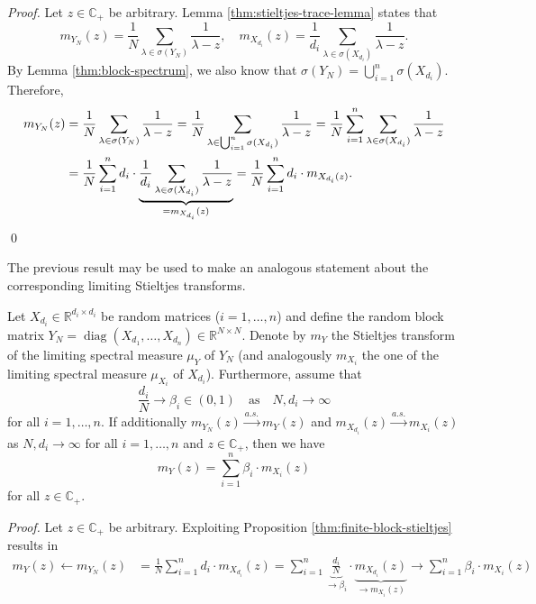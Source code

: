 \documentclass{article}
\begin{document}
\smallskip
\noindent
\emph{Proof.} Let $z\in\mathbb{C}_+$ be arbitrary. Lemma \ref{thm:stieltjes-trace-lemma} states that
\begin{equation}
m_{Y_N}(z)=\frac{1}{N}\sum_{\lambda\in\sigma(Y_N)}\frac{1}{\lambda-z},\quad m_{X_{d_i}}(z)=\frac{1}{d_i}\sum_{\lambda\in\sigma(X_{d_i})}\frac{1}{\lambda-z}.
\end{equation}
By Lemma \ref{thm:block-spectrum}, we also know that $\sigma(Y_N)=\bigcup_{i=1}^n\sigma(X_{d_i})$. Therefore,
\begin{align}
m_{Y_N}(z) &= \frac{1}{N}\sum_{\lambda\in\sigma(Y_N)}\frac{1}{\lambda-z} = \frac{1}{N}\sum_{\lambda\in\bigcup_{i=1}^n\sigma(X_{d_i})}\frac{1}{\lambda-z} = \frac{1}{N}\sum_{i=1}^n\sum_{\lambda\in\sigma(X_{d_i})}\frac{1}{\lambda-z} \notag
\\ &= \frac{1}{N}\sum_{i=1}^nd_i\cdot\underbrace{\frac{1}{d_i}\sum_{\lambda\in\sigma(X_{d_i})}\frac{1}{\lambda-z}}_{=m_{X_{d_i}}(z)} = \frac{1}{N}\sum_{i=1}^n d_i\cdot m_{X_{d_i}(z)}.
\end{align}
\qed
\bigskip
\par
The previous result may be used to make an analogous statement about the corresponding limiting Stieltjes transforms.
\bigskip
\begin{corollary}\label{thm:limiting-block-stieltjes}
Let $X_{d_i}\in\mathbb{R}^{d_i\times d_i}$ be random matrices ($i=1,\dots, n$) and define the random block matrix $Y_N=\operatorname{diag}(X_{d_1},\dots,X_{d_n})\in\mathbb{R}^{N\times N}$. Denote by $m_Y$ the Stieltjes transform of the limiting spectral measure $\mu_Y$ of $Y_N$ (and analogously $m_{X_i}$ the one of the limiting spectral measure $\mu_{X_i}$ of $X_{d_i}$). Furthermore, assume that 
$$\frac{d_i}{N}\to\beta_i\in(0,1)\quad\text{as}\quad N,d_i\to\infty$$
for all $i=1,\dots,n$. If additionally $m_{Y_N}(z)\stackrel{a.s.}{\to} m_Y(z)$ and $m_{X_{d_i}}(z)\stackrel{a.s.}{\to} m_{X_i}(z)$ as $N,d_i\to\infty$ for all $i=1,\dots,n$ and $z\in\mathbb{C}_+$, then we have
$$m_Y(z)=\sum_{i=1}^n\beta_i\cdot m_{X_i}(z)$$
for all $z\in\mathbb{C}_+$.
\end{corollary}
\bigskip
\noindent
\emph{Proof.} Let $z\in\mathbb{C}_+$ be arbitrary. Exploiting Proposition \ref{thm:finite-block-stieltjes} results in
\begin{align}
m_Y(z)\leftarrow m_{Y_N}(z) &= \frac{1}{N}\sum_{i=1}^n d_i\cdot m_{X_{d_i}}(z) = \sum_{i=1}^n\underbrace{\frac{d_i}{N}}_{\to\beta_i}\cdot \underbrace{m_{X_{d_i}}(z)}_{\to m_{X_i}(z)} \to \sum_{i=1}^n\beta_i\cdot m_{X_i}(z)
\end{align}
\end{document}
